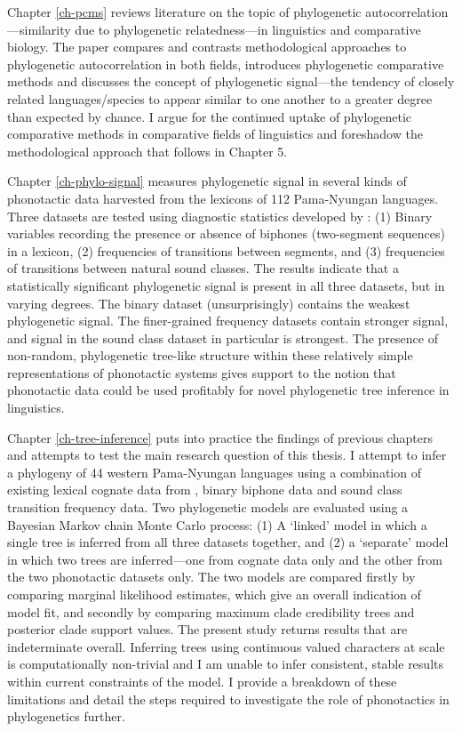 Chapter \ref{ch-pcms} reviews literature on the topic of phylogenetic autocorrelation---similarity due to phylogenetic relatedness---in linguistics and comparative biology. The paper compares and contrasts methodological approaches to phylogenetic autocorrelation in both fields, introduces phylogenetic comparative methods and discusses the concept of phylogenetic signal---the tendency of closely related languages/species to appear similar to one another to a greater degree than expected by chance. I argue for the continued uptake of phylogenetic comparative methods in comparative fields of linguistics and foreshadow the methodological approach that follows in Chapter 5.

Chapter \ref{ch-phylo-signal} measures phylogenetic signal in several kinds of phonotactic data harvested from the lexicons of 112 Pama-Nyungan languages. Three datasets are tested using diagnostic statistics developed by \textcite{blomberg_testing_2003}: (1) Binary variables recording the presence or absence of biphones (two-segment sequences) in a lexicon, (2) frequencies of transitions between segments, and (3) frequencies of transitions between natural sound classes. The results indicate that a statistically significant phylogenetic signal is present in all three datasets, but in varying degrees. The binary dataset (unsurprisingly) contains the weakest phylogenetic signal. The finer-grained frequency datasets contain stronger signal, and signal in the sound class dataset in particular is strongest. The presence of non-random, phylogenetic tree-like structure within these relatively simple representations of phonotactic systems gives support to the notion that phonotactic data could be used profitably for novel phylogenetic tree inference in linguistics.

Chapter \ref{ch-tree-inference} puts into practice the findings of previous chapters and attempts to test the main research question of this thesis. I attempt to infer a phylogeny of 44 western Pama-Nyungan languages using a combination of existing lexical cognate data from \textcite{bouckaert_origin_2018}, binary biphone data and sound class transition frequency data. Two phylogenetic models are evaluated using a Bayesian Markov chain Monte Carlo process: (1) A `linked' model in which a single tree is inferred from all three datasets together, and (2) a `separate' model in which two trees are inferred---one from cognate data only and the other from the two phonotactic datasets only. The two models are compared firstly by comparing marginal likelihood estimates, which give an overall indication of model fit, and secondly by comparing maximum clade credibility trees and posterior clade support values. The present study returns results that are indeterminate overall. Inferring trees using continuous valued characters at scale is computationally non-trivial and I am unable to infer consistent, stable results within current constraints of the model. I provide a breakdown of these limitations and detail the steps required to investigate the role of phonotactics in phylogenetics further.

